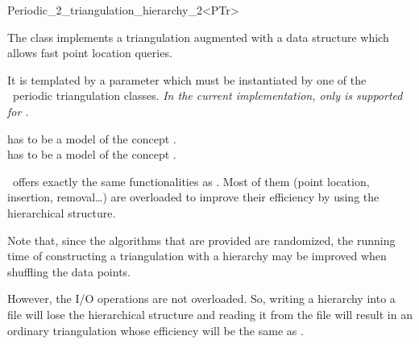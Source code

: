 

\begin{ccRefClass}{Periodic_2_triangulation_hierarchy_2<PTr>}

\ccDefinition

The class  implements a
triangulation augmented with a data structure which allows fast point
location queries. 


\ccParameters

It is templated by a parameter which must be instantiated by one of the \cgal\
periodic triangulation classes.  \textit{In the current
  implementation, only  is
  supported for \ccc{PTr}.} 

 has to be a model of the concept
.\\
 has to be a model of the concept
.

\ccInheritsFrom


\ccRefName\ offers exactly the same functionalities as .
Most of them (point location, insertion, removal\ldots) are overloaded to
improve their efficiency by using the hierarchical structure. 

Note that, since the algorithms that are provided are randomized, the
running time of constructing a triangulation with a hierarchy may be
improved when shuffling the data points.

However, the I/O operations are not overloaded. So, writing a
hierarchy into a file will lose the hierarchical structure and reading
it from the file will result in an ordinary triangulation whose
efficiency will be the same as .


\end{ccRefClass}
